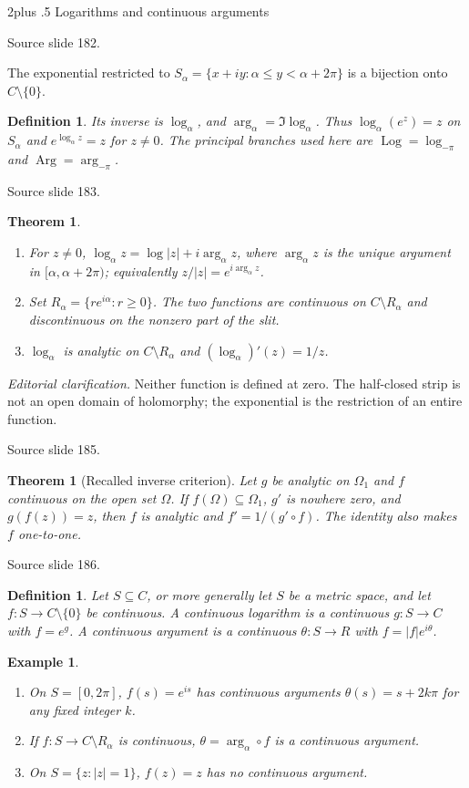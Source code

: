\documentclass[10pt,letterpaper,twoside,openright]{amsbook}
\makeatletter
\numberwithin{equation}{subsection}
\renewcommand{\section}{\@startsection{section}{1}
 {\z@}{2\baselineskip plus .5\baselineskip}
 {\baselineskip}{\normalfont\Large\bfseries\centering}}
\theoremstyle{sea-plain}
\newtheorem{theorem}[subsection]{Theorem}
\theoremstyle{sea-definition}
\newtheorem{definition}[subsection]{Definition}
\newtheorem{example}[subsection]{Example}
\theoremstyle{sea-exercise}
\newcommand{\RR}{\mathbb{R}}
\newcommand{\CC}{\mathbb{C}}
\newcommand{\DD}{\mathbb{D}}
\newcommand{\HH}{\mathbb{H}}
\newcommand{\Chat}{\mathbb{C}_{\infty}}
\def\CC{C}\def\RR{R}\def\DD{D}\def\HH{H}\def\Chat{C infinity}}
\newcommand{\src}[1]{\par\smallskip\noindent
 {\scriptsize\sffamily\color{SoftWhite}Source slide #1.}\par\nopagebreak\smallskip}
\newcommand{\editorial}[1]{\par\smallskip\noindent
 {\small\textit{Editorial clarification.} #1}\par\smallskip}
\makeatother
\begin{document}
\section{Logarithms and continuous arguments}
\src{182}
The exponential restricted to $S_\alpha=\{x+iy:\alpha\le y<\alpha+2\pi\}$
is a bijection onto $\CC\setminus\{0\}$.
\begin{definition}
Its inverse is $\log_\alpha$, and $\arg_\alpha=\Im\log_\alpha$.
Thus $\log_\alpha(e^z)=z$ on $S_\alpha$ and
$e^{\log_\alpha z}=z$ for $z\ne0$.
The principal branches used here are
$\operatorname{Log}=\log_{-\pi}$ and $\operatorname{Arg}=\arg_{-\pi}$.
\end{definition}
\src{183}
\begin{theorem}
\begin{enumerate}
\item For $z\ne0$, $\log_\alpha z=\log|z|+i\arg_\alpha z$,
where $\arg_\alpha z$ is the unique argument in $[\alpha,\alpha+2\pi)$;
equivalently $z/|z|=e^{i\arg_\alpha z}$.
\item Set $R_\alpha=\{re^{i\alpha}:r\ge0\}$. The two functions are
continuous on $\CC\setminus R_\alpha$ and discontinuous on the
nonzero part of the slit.
\item $\log_\alpha$ is analytic on $\CC\setminus R_\alpha$ and
$(\log_\alpha)'(z)=1/z$.
\end{enumerate}
\end{theorem}
\editorial{Neither function is defined at zero. The half-closed strip
is not an open domain of holomorphy; the exponential is the restriction
of an entire function.}
\src{185}
\begin{theorem}[Recalled inverse criterion]
Let $g$ be analytic on $\Omega_1$ and $f$ continuous on the open set
$\Omega$. If $f(\Omega)\subseteq\Omega_1$, $g'$ is nowhere zero,
and $g(f(z))=z$, then $f$ is analytic and
$f'=1/(g'\circ f)$. The identity also makes $f$ one-to-one.
\end{theorem}
\src{186}
\begin{definition}
Let $S\subseteq\CC$, or more generally let $S$ be a metric space,
and let $f:S\to\CC\setminus\{0\}$ be continuous.
A continuous logarithm is a continuous $g:S\to\CC$ with $f=e^g$.
A continuous argument is a continuous $\theta:S\to\RR$ with
$f=|f|e^{i\theta}$.
\end{definition}
\begin{example}
\begin{enumerate}
\item On $S=[0,2\pi]$, $f(s)=e^{is}$ has continuous arguments
$\theta(s)=s+2k\pi$ for any fixed integer $k$.
\item If $f:S\to\CC\setminus R_\alpha$ is continuous,
$\theta=\arg_\alpha\circ f$ is a continuous argument.
\item On $S=\{z:|z|=1\}$, $f(z)=z$ has no continuous argument.
\end{enumerate}
\end{example}
\end{document}
